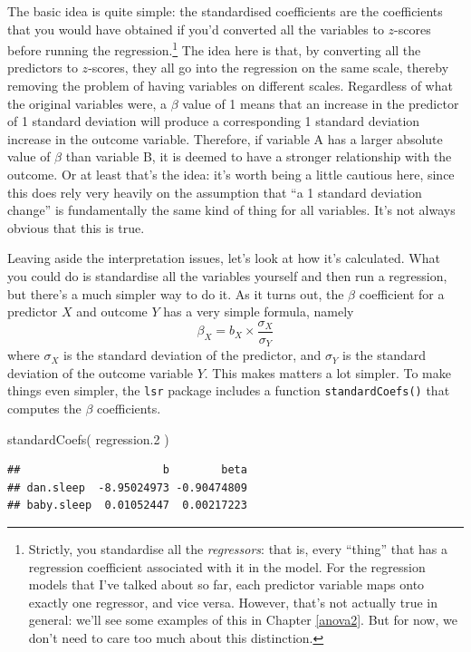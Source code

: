 \documentclass[
]{book}
\newenvironment{Shaded}{\begin{snugshade}}{\end{snugshade}}
\newcommand{\FloatTok}[1]{\textcolor[rgb]{0.00,0.00,0.81}{#1}}
\newcommand{\FunctionTok}[1]{\textcolor[rgb]{0.00,0.00,0.00}{#1}}
\newcommand{\NormalTok}[1]{#1}
\begin{document}
The basic idea is quite simple: the standardised coefficients are the coefficients that you would have obtained if you'd converted all the variables to \(z\)-scores before running the regression.\footnote{Strictly, you standardise all the \emph{regressors}: that is, every ``thing'' that has a regression coefficient associated with it in the model. For the regression models that I've talked about so far, each predictor variable maps onto exactly one regressor, and vice versa. However, that's not actually true in general: we'll see some examples of this in Chapter \ref{anova2}. But for now, we don't need to care too much about this distinction.} The idea here is that, by converting all the predictors to \(z\)-scores, they all go into the regression on the same scale, thereby removing the problem of having variables on different scales. Regardless of what the original variables were, a \(\beta\) value of 1 means that an increase in the predictor of 1 standard deviation will produce a corresponding 1 standard deviation increase in the outcome variable. Therefore, if variable A has a larger absolute value of \(\beta\) than variable B, it is deemed to have a stronger relationship with the outcome. Or at least that's the idea: it's worth being a little cautious here, since this does rely very heavily on the assumption that ``a 1 standard deviation change'' is fundamentally the same kind of thing for all variables. It's not always obvious that this is true.

Leaving aside the interpretation issues, let's look at how it's calculated. What you could do is standardise all the variables yourself and then run a regression, but there's a much simpler way to do it. As it turns out, the \(\beta\) coefficient for a predictor \(X\) and outcome \(Y\) has a very simple formula, namely
\[
\beta_X = b_X \times \frac{\sigma_X}{\sigma_Y} 
\]
where \(\sigma_X\) is the standard deviation of the predictor, and \(\sigma_Y\) is the standard deviation of the outcome variable \(Y\). This makes matters a lot simpler. To make things even simpler, the \texttt{lsr} package includes a function \texttt{standardCoefs()} that computes the \(\beta\) coefficients.

\begin{Shaded}
\begin{Highlighting}[]
\FunctionTok{standardCoefs}\NormalTok{( regression}\FloatTok{.2}\NormalTok{ )}
\end{Highlighting}
\end{Shaded}

\begin{verbatim}
##                      b        beta
## dan.sleep  -8.95024973 -0.90474809
## baby.sleep  0.01052447  0.00217223
\end{verbatim}
\end{document}
